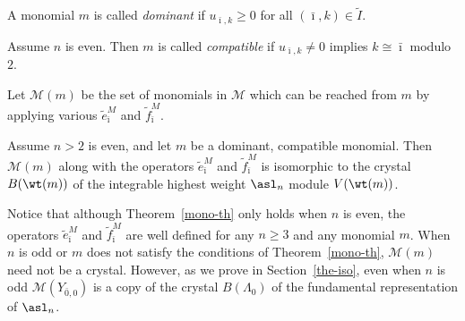\begin{Definition} A monomial $m$ is called \emph{dominant} if $u_{\bar \imath, k} \geq 0$ for all $(\bar \imath, k) \in \widetilde I.$
\end{Definition}

\begin{Definition} \label{compatibe-def} Assume $n$ is even. Then
$m$ is called \emph{compatible} if $u_{\bar \imath, k} \neq 0$ implies $k \cong \bar \imath$ modulo~$2$.
\end{Definition}

\begin{Definition}
Let $\mathcal{M}(m)$ be the set of monomials in $\mathcal{M}$ which can be reached from $m$ by applying various $\tilde e_{\bar \imath}^M$ and $\tilde f_{\bar \imath}^M$.
\end{Definition}

\begin{Theorem}  \label{mono-th}
Assume $n >2$ is even, and let $m$ be a dominant, compa\-tib\-le monomial. Then $\mathcal{M}(m)$ along with the operators $\tilde e_{\bar \imath}^M$ and $\tilde f_{\bar \imath}^M$ is isomorphic to the crystal $B({\wt(m)})$ of the integrable highest weight $\asl_n$ module $V({\wt(m)})$.
\end{Theorem}

\begin{Remark}
Notice that although Theorem~\ref{mono-th} only holds when $n$ is even, the operators $\tilde e_{\bar \imath}^M$ and $\tilde f_{\bar \imath}^M$ are well def\/ined for any $n \geq 3$ and any monomial $m$. When $n$ is odd or $m$ does not satisfy the conditions of Theorem~\ref{mono-th}, $\mathcal{M}(m)$ need not be a crystal. However, as we prove in Section~\ref{the-iso}, even when $n$ is odd $\mathcal{M}(Y_{\bar 0, 0})$ is a copy of the crystal $B(\Lambda_0)$ of the fundamental representation of $\asl_n$.
\end{Remark}

